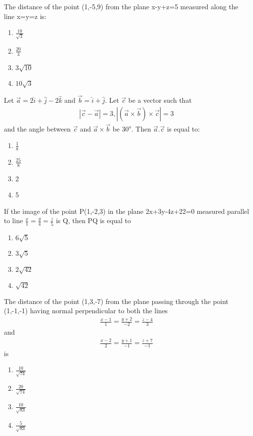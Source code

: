 \item The distance of the point (1,-5,9) from the plane x-y+z=5 measured along the line x=y=z is:
\begin{enumerate}
\item $\frac{10}{\sqrt{3}}$
\item $\frac{20}{3}$
\item $3\sqrt{10}$
\item $10\sqrt{3}$
\end{enumerate}

\item Let $\overrightarrow{a}=2\hat{i}+\hat{j}-2\hat{k}$ and $\overrightarrow{b}=\hat{i}+\hat{j}$. Let $\overrightarrow{c}$ be a vector such that
\begin{align*}
|\overrightarrow{c}-\overrightarrow{a}|=3, |(\overrightarrow{a} \times \overrightarrow{b}) \times \overrightarrow{c}|=3
\end{align*}
and the angle between $\overrightarrow{c}$ and $\overrightarrow{a} \times \overrightarrow{b}$ be $30^{o}$. Then $\overrightarrow{a}.\overrightarrow{c}$ is equal to:
\begin{enumerate}
\item $\frac{1}{8}$
\item $\frac{25}{8}$
\item 2
\item 5
\end{enumerate}

\item If the image of the point P(1,-2,3) in the plane 2x+3y-4z+22=0 measured parallel to line $\frac{x}{1}=\frac{y}{4}=\frac{z}{5}$ is Q, then PQ is equal to
\begin{enumerate}
\item $6\sqrt{5}$
\item $3\sqrt{5}$
\item $2\sqrt{42}$
\item $\sqrt{42}$
\end{enumerate}

\item The distance of the point (1,3,-7) from the plane passing through the point (1,-1,-1) having normal perpendicular to both the lines
\begin{align*}
\frac{x-1}{1}=\frac{y+2}{-2}=\frac{z-4}{3}
\end{align*}
and
\begin{align*}
\frac{x-2}{2}=\frac{y+1}{-1}=\frac{z+7}{-1}
\end{align*}
is
\begin{enumerate}
\item $\frac{10}{\sqrt{74}}$
\item $\frac{20}{\sqrt{74}}$
\item $\frac{10}{\sqrt{83}}$
\item $\frac{5}{\sqrt{83}}$
\end{enumerate}

